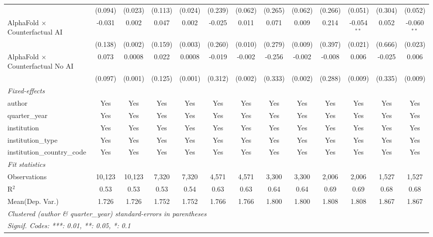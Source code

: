 \begin{tabular}{lcccccccccccc}
                                            & (0.094) & (0.023) & (0.113) & (0.024) & (0.239) & (0.062) & (0.265)     & (0.062)     & (0.266) & (0.051)       & (0.304) & (0.052)\\   
   AlphaFold $\times$ Counterfactual AI     & -0.031  & 0.002   & 0.047   & 0.002   & -0.025  & 0.011   & 0.071       & 0.009       & 0.214   & -0.054$^{**}$ & 0.052   & -0.060$^{**}$\\   
                                            & (0.138) & (0.002) & (0.159) & (0.003) & (0.260) & (0.010) & (0.279)     & (0.009)     & (0.397) & (0.021)       & (0.666) & (0.023)\\   
   AlphaFold $\times$ Counterfactual No AI  & 0.073   & 0.0008  & 0.022   & 0.0008  & -0.019  & -0.002  & -0.256      & -0.002      & -0.008  & 0.006         & -0.025  & 0.006\\   
                                            & (0.097) & (0.001) & (0.125) & (0.001) & (0.312) & (0.002) & (0.333)     & (0.002)     & (0.288) & (0.009)       & (0.335) & (0.009)\\   
   \midrule
   \emph{Fixed-effects}\\
   author                                   & Yes     & Yes     & Yes     & Yes     & Yes     & Yes     & Yes         & Yes         & Yes     & Yes           & Yes     & Yes\\  
   quarter\_year                            & Yes     & Yes     & Yes     & Yes     & Yes     & Yes     & Yes         & Yes         & Yes     & Yes           & Yes     & Yes\\  
   institution                              & Yes     & Yes     & Yes     & Yes     & Yes     & Yes     & Yes         & Yes         & Yes     & Yes           & Yes     & Yes\\  
   institution\_type                        & Yes     & Yes     & Yes     & Yes     & Yes     & Yes     & Yes         & Yes         & Yes     & Yes           & Yes     & Yes\\  
   institution\_country\_code               & Yes     & Yes     & Yes     & Yes     & Yes     & Yes     & Yes         & Yes         & Yes     & Yes           & Yes     & Yes\\  
   \midrule
   \emph{Fit statistics}\\
   Observations                             & 10,123  & 10,123  & 7,320   & 7,320   & 4,571   & 4,571   & 3,300       & 3,300       & 2,006   & 2,006         & 1,527   & 1,527\\  
   R$^2$                                    & 0.53    & 0.53    & 0.53    & 0.54    & 0.63    & 0.63    & 0.64        & 0.64        & 0.69    & 0.69          & 0.68    & 0.68\\  
Mean(Dep. Var.) & 1.726 & 1.726 & 1.752 & 1.752 & 1.766 & 1.766 & 1.800 & 1.800 & 1.808 & 1.808 & 1.867 & 1.867 \\
   \midrule \midrule
   \multicolumn{13}{l}{\emph{Clustered (author \& quarter\_year) standard-errors in parentheses}}\\
   \multicolumn{13}{l}{\emph{Signif. Codes: ***: 0.01, **: 0.05, *: 0.1}}\\
\end{tabular}
\par\endgroup
